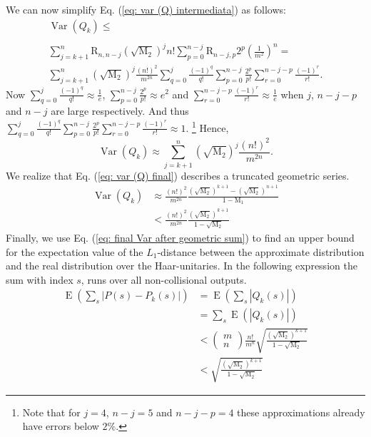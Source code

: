 \documentclass[10pt,aps,pra,twocolumn,superscriptaddress]{revtex4-2}
\DeclareMathOperator{\E}{E}
\DeclareMathOperator{\Var}{Var}
\begin{document}
We can now simplify Eq. (\ref{eq: var (Q) intermediata}) as follows:
\begin{multline}
\Var(Q_k)\leq\\
    \\\sum_{j=k+1}^n \mathrm{R}_{n,n-j} \left(\sqrt{\mathrm{M}_2}\right)^{j} n!\sum^{n-j}_{p=0}\mathrm{R}_{n-j,p}2^p\left(\frac{1}{m^2}\right)^{n}=\\
    \sum_{j=k+1}^n \left(\sqrt{\mathrm{M}_2}\right)^{j} \frac{(n!)^2}{m^{2n}}\sum_{q=0}^{j}\frac{(-1)^q}{q!}\sum^{n-j}_{p=0}\frac{2^p}{p!}\sum_{r=0}^{n-j-p}\frac{(-1)^r}{r!}.
    \label{eq: var (Q) intermediatc}
\end{multline}
Now $\sum_{q=0}^{j}\frac{(-1)^q}{q!}\approx \frac{1}{e}$, 
$\sum^{n-j}_{p=0}\frac{2^p}{p!}\approx e^2$ and 
$\sum_{r=0}^{n-j-p}\frac{(-1)^r}{r!}\approx \frac{1}{e}$ when $j$, $n-j-p$ and $n-j$ are large respectively. And thus $\sum_{q=0}^{j}\frac{(-1)^q}{q!}\sum^{n-j}_{p=0}\frac{2^p}{p!}\sum_{r=0}^{n-j-p}\frac{(-1)^r}{r!}\approx 1$. 
\footnote{Note that for $j=4$, $n-j=5$ and $n-j-p=4$ these approximations already have errors below $2\%$.}
Hence,
\begin{equation}
    \Var(Q_k)\approx \sum_{j=k+1}^n \left(\sqrt{\mathrm{M}_2}\right)^{j} \frac{(n!)^2}{m^{2n}}.
    \label{eq: var (Q) final}
\end{equation}
We realize that Eq. (\ref{eq: var (Q) final}) describes a truncated geometric series.
\begin{equation}
\begin{split}
        \Var(Q_k)&\approx \frac{(n!)^2}{m^{2n}}\frac{(\sqrt{\mathrm{M}_2})^{k+1}-(\sqrt{\mathrm{M}_2})^{n+1}}{1-\mathrm{M}_1}\\
    &<\frac{(n!)^2}{m^{2n}}\frac{(\sqrt{\mathrm{M}_2})^{k+1}}{1-\sqrt{\mathrm{M}_2}}
\end{split}
\label{eq: final Var after geometric sum}
\end{equation}
Finally, we use Eq. (\ref{eq: final Var after geometric sum}) to find an upper bound for the expectation value of the $L_1$-distance between the approximate distribution and the real distribution over the Haar-unitaries. In the following expression the sum with index $s$, runs over all non-collisional outputs.
\begin{equation}
\begin{split}
    \E\left(\sum_s|P(s)-P_k(s)|\right)&=\E\left(\sum_s|Q_k(s)|\right)\\
    &=\sum_s\E\left(|Q_k(s)|\right)\\
    &<\begin{pmatrix}m\\n\end{pmatrix}\frac{n!}{m^n}\sqrt{\frac{(\sqrt{\mathrm{M}_2})^{k+1}}{1-\sqrt{\mathrm{M}_2}}}\\
    &<\sqrt{\frac{(\sqrt{\mathrm{M}_2})^{k+1}}{1-\sqrt{\mathrm{M}_2}}}
\end{split}
\label{eq: upper bound appendix}
\end{equation}
\end{document}
